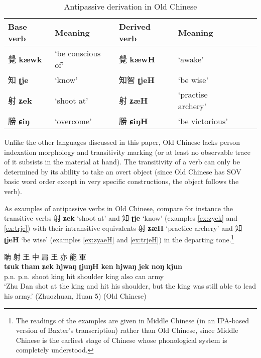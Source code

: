 \documentclass[oneside,a4paper,11pt]{article}
\newcommand{\ipa}[1]{{\phon\textbf{#1}}}
\newcommand{\zh}[1]{{\cn #1}}
\begin{document}
\begin{table}[H]
\caption{Antipassive derivation in Old Chinese} \label{tab:oc} \centering
\begin{tabular}{llllll}
\toprule
Base verb & Meaning & Derived verb & Meaning \\
\midrule
\zh{覺} \ipa{kæwk} & `be conscious of' &  \zh{覺} \ipa{kæwH}& `awake' \\
\zh{知} \ipa{ʈje} & `know' &  \zh{知智} \ipa{ʈjeH}& `be wise' \\
\zh{射} \ipa{ʑek} & `shoot at' &  \zh{射} \ipa{ʑæH}& `practise archery' \\
\zh{勝} \ipa{ɕiŋ} & `overcome' &  \zh{勝} \ipa{ɕiŋH}& `be victorious' \\
\bottomrule
\end{tabular}
\end{table}

Unlike the other languages discussed in this paper, Old Chinese lacks person indexation morphology and transitivity marking (or at least no observable trace of it subsists in the material at hand). The transitivity of a verb can only be determined by its ability to take an overt object (since Old Chinese has SOV basic word order except in very specific constructions, the object follows the verb).

As examples of antipassive verbs in Old Chinese, compare for instance the transitive verbs \zh{射} \ipa{ʑek} `shoot at'  and \zh{知} \ipa{ʈje}  `know'  (examples \ref{ex:zyek} and \ref{ex:trje}) with their intransitive equivalents \zh{射} \ipa{ʑæH}  `practice archery' and  \zh{知} \ipa{ʈjeH} `be wise' (examples \ref{ex:zyaeH} and \ref{ex:trjeH}) in the departing tone.\footnote{The readings of the examples are given in Middle Chinese (in an IPA-based version of Baxter's \citeyear{baxter92} transcription) rather than Old Chinese, since Middle Chinese is the earliest stage of Chinese whose phonological system is completely understood. }

\begin{exe}
\ex \label{ex:zyek}
\glt
\glt \zh{祝聃射王中肩，王亦能軍}  %
\glll \zh{祝} \zh{聃} \zh{射} \zh{王} \zh{中} \zh{肩} \zh{王} \zh{亦} \zh{能} \zh{軍} \\
\ipa{tɕuk} \ipa{tham} \ipa{ʑek} \ipa{hjwaŋ} \ipa{ʈjuŋH} \ipa{ken} \ipa{hjwaŋ}  \ipa{jek}   \ipa{noŋ} \ipa{kjun}     \\
p.n. p.n. shoot king hit shoulder king also can army \\
\glt `Zhu Dan shot at the king and hit his shoulder, but the king was still able to lead his army.'  (Zhuozhuan, Huan 5) (Old Chinese)
\end{exe}
\end{document}
